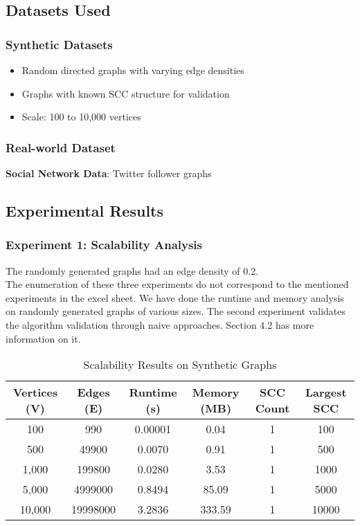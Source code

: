 \documentclass{book}
\theoremstyle{definition}
\begin{document}
\subsection{Datasets Used}

\subsubsection{Synthetic Datasets}
\begin{itemize}
    \item Random directed graphs with varying edge densities
    \item Graphs with known SCC structure for validation
    \item Scale: 100 to 10,000 vertices
\end{itemize}

\subsubsection{Real-world Dataset}
\textbf{Social Network Data}: Twitter follower graphs

\subsection{Experimental Results}

\subsubsection{Experiment 1: Scalability Analysis}

The randomly generated graphs had an edge density of 0.2. \\
The enumeration of these three experiments do not correspond to the mentioned experiments in the excel sheet. We have done the runtime and memory analysis on randomly generated graphs of various sizes. The second experiment validates the algorithm validation through naive approaches. Section 4.2 has more information on it.


\begin{table}[h]
\centering
\begin{tabular}{cccccc}
\toprule
\textbf{Vertices (V)} & \textbf{Edges (E)} & \textbf{Runtime (s)} & \textbf{Memory (MB)} & \textbf{SCC Count} & \textbf{Largest SCC} \\
\midrule
100 & 990& 0.00001& 0.04& 1& 100\\
500 & 49900& 0.0070& 0.91& 1& 500\\
1,000 & 199800& 0.0280& 3.53& 1& 1000\\
5,000 & 4999000& 0.8494& 85.09& 1& 5000\\
10,000 & 19998000& 3.2836& 333.59& 1& 10000\\
\bottomrule
\end{tabular}
\caption{Scalability Results on Synthetic Graphs}
\end{table}
\end{document}
